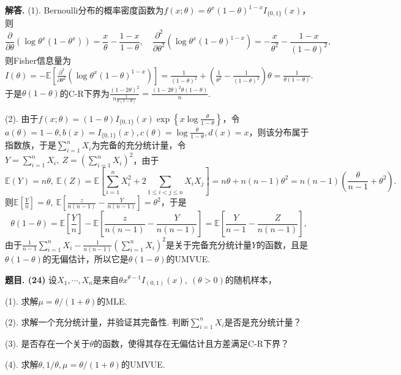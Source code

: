 \documentclass[12pt, a4paper, oneside]{ctexart}
\newcounter{problem}  %
\newenvironment{problem}[1][]{\stepcounter{problem}\par\noindent\textbf{题目\arabic{problem}. #1}}{\smallskip\par}
\newenvironment{solution}[1][]{\par\noindent\textbf{#1解答. }}{\smallskip\par}  %
\let\leq=\leqslant %
\def\E{\mathbb{E}}          %
\def\add{\vspace{1ex}}      %
\begin{document}
\begin{solution}
    (1). Bernoulli分布的概率密度函数为$f(x;\theta) = \theta^x(1-\theta)^{1-x}I_{\{0,1\}}(x)$，则
    \begin{equation*}
        \frac{\partial}{\partial\theta}(\log\theta^x(1-\theta^x)) = \frac{x}{\theta}-\frac{1-x}{1-\theta},\quad \frac{\partial^2}{\partial\theta^2}(\log\theta^x(1-\theta)^{1-x}) = -\frac{x}{\theta^2}-\frac{1-x}{(1-\theta)^2},
    \end{equation*}
    则Fisher信息量为$I(\theta) = -\E\left[\frac{\partial^2}{\partial\theta^2}(\log\theta^x(1-\theta)^{1-x})\right] = \frac{1}{(1-\theta)^2}+\left(\frac{1}{\theta^2}-\frac{1}{(1-\theta)^2}\right)\theta = \frac{1}{\theta(1-\theta)}$.\add 于是$\theta(1-\theta)$的C-R下界为$\frac{(1-2\theta)^2}{n\frac{1}{\theta(1-\theta)}} = \frac{(1-2\theta)^2\theta(1-\theta)}{n}$.\add

    (2). 由于$f(x;\theta) = (1-\theta) I_{\{0,1\}}(x)\exp\left\{x\log\frac{\theta}{1-\theta}\right\}$，令$a(\theta) = 1-\theta, b(x) = I_{\{0,1\}}(x),c(\theta) = \log\frac{\theta}{1-\theta},d(x) =x$，则该分布属于指数族，于是$\sum_{i=1}^nX_i$为完备的充分统计量，令$Y = \sum_{i=1}^nX_i,\ Z = \left(\sum_{i=1}^nX_i\right)^2$，由于
    \begin{equation*}
        \E(Y) = n\theta,\ \E(Z) = \E\left[\sum_{i=1}^nX_i^2+2\sum_{1\leq i < j\leq n}X_iX_j\right] = n\theta+n(n-1)\theta^2 = n(n-1)\left(\frac{\theta}{n-1}+\theta^2\right).
    \end{equation*}
    则$\E\left[\frac{Y}{n}\right] = \theta,\ \E\left[\frac{z}{n(n-1)}-\frac{Y}{n(n-1)}\right]=\theta^2$，于是
    \begin{equation*}
        \theta(1-\theta) = \E\left[\frac{Y}{n}\right]-\E\left[\frac{z}{n(n-1)}-\frac{Y}{n(n-1)}\right] = \E\left[\frac{Y}{n-1}-\frac{Z}{n(n-1)}\right],
    \end{equation*}
    由于$\frac{1}{n-1}\sum_{i=1}^nX_i-\frac{1}{n(n-1)}\left(\sum_{i=1}^nX_i\right)^2$是关于完备充分统计量$Y$的函数，\add 且是$\theta(1-\theta)$的无偏估计，所以它是$\theta(1-\theta)$的UMVUE.\add
\end{solution}
\begin{problem}[(24)]
    设$X_1,\cdots,X_n$是来自$\theta x^{\theta-1}I_{(0,1)}(x),\ (\theta > 0)$的随机样本，

    (1). 求解$\mu = \theta/(1+\theta)$的MLE.

    (2). 求解一个充分统计量，并验证其完备性. 判断$\sum_{i=1}^nX_i$是否是充分统计量？

    (3). 是否存在一个关于$\theta$的函数，使得其存在无偏估计且方差满足C-R下界？

    (4). 求解$\theta,1/\theta, \mu=\theta/(1+\theta)$的UMVUE.
\end{problem}
\end{document}

